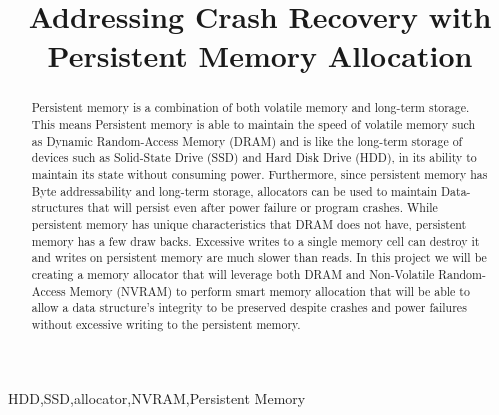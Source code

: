 \documentclass[conference]{IEEEtran}
\begin{document}
\title{Addressing Crash Recovery with Persistent Memory Allocation\\
{\footnotesize \textsuperscript{}}
}

\author{
\and
{}
\and
{}
}
\maketitle

\begin{abstract}
Persistent memory is a combination of both volatile memory and long-term storage.  This means Persistent memory is able to maintain the speed of volatile memory such as Dynamic Random-Access Memory (DRAM) and is like the long-term storage of devices such as Solid-State Drive (SSD) and Hard Disk Drive (HDD), in its ability to maintain its state without consuming power. Furthermore, since persistent memory has Byte addressability and long-term storage, allocators can be used to maintain Data-structures that will persist even after power failure or program crashes. While persistent memory has unique characteristics that DRAM does not have, persistent memory has a few draw backs. Excessive writes to a single memory cell can destroy it and writes on persistent memory are much slower than reads. In this project we will be creating a memory allocator that will leverage both DRAM and Non-Volatile Random-Access Memory (NVRAM) to perform smart memory allocation that will be able to allow a data structure’s integrity to be preserved despite crashes and power failures without excessive writing to the persistent memory.
\end{abstract}

\begin{IEEEkeywords}
HDD,SSD,allocator,NVRAM,Persistent Memory
\end{IEEEkeywords}
\end{document}
